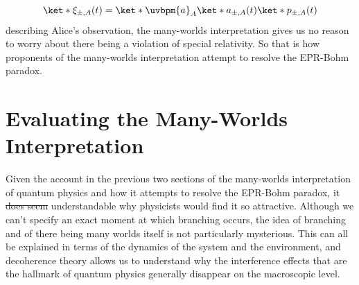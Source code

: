 \documentclass[12pt]{report}
\providecommand{\DIFadd}[1]{{\protect\color{blue}\uwave{#1}}} %
\providecommand{\DIFdel}[1]{{\protect\color{red}\sout{#1}}}                      %
\providecommand{\DIFaddbegin}{} %
\providecommand{\DIFaddend}{} %
\providecommand{\DIFdelbegin}{} %
\providecommand{\DIFdelend}{} %
\begin{document}
$$\ket*{\xi_{\pm,A}(t)}=\ket*{\uvbpm{a}}_A\ket*{a_{\pm,A}(t)}\ket*{p_{\pm, A}(t)}$$
describing Alice's observation, the many-worlds interpretation gives us no reason to worry about there being a violation of special relativity. So that is how proponents of the many-worlds interpretation attempt to resolve the EPR-Bohm paradox.






    
    \section{Evaluating the Many-Worlds Interpretation}\label{manyworldsinterpretation2}
    Given the account in the previous two sections of the many-worlds interpretation of quantum physics and how it attempts to resolve the EPR-Bohm paradox, it \DIFdelbegin \DIFdel{does seem }\DIFdelend \DIFaddbegin \DIFadd{is }\DIFaddend understandable why physicists would find it so attractive. Although we can't specify an exact moment at which branching occurs, the idea of branching and of there being many worlds itself is not particularly mysterious. This can all be explained in terms of the dynamics of the system and the environment, and decoherence theory allows us to understand why the interference effects that are the hallmark of quantum physics generally disappear on the macroscopic level. 
\end{document}
